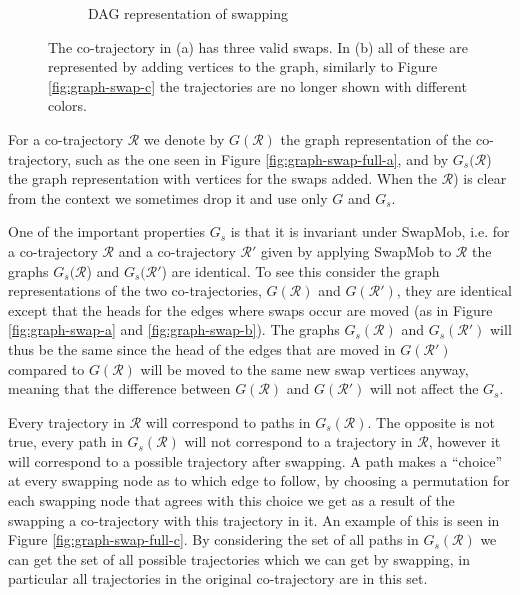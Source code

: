 \documentclass[12pt]{article}
\newcommand{\cotraj}{\mathcal{R}}
\newcommand{\graph}{G}
\newcommand{\swapgraph}{G_s}
\theoremstyle{definition}
\begin{document}
\begin{figure}
\begin{subfigure}[t]{0.45\textwidth}
      \caption{DAG representation of swapping}
      \label{fig:graph-swap-full-b}
    \end{subfigure}
    \caption{The co-trajectory in (a) has three valid swaps. In (b)
      all of these are represented by adding vertices to the graph,
      similarly to Figure \ref{fig:graph-swap-c} the trajectories are
      no longer shown with different colors.}
    \label{fig:graph-swap-full}
\end{figure}

For a co-trajectory \(\cotraj\) we denote by \(\graph(\cotraj)\) the
graph representation of the co-trajectory, such as the one seen in
Figure \ref{fig:graph-swap-full-a}, and by \(\swapgraph(\cotraj\)) the
graph representation with vertices for the swaps added. When the
\(\cotraj\)) is clear from the context we sometimes drop it and use
only \(\graph\) and \(\swapgraph\).

One of the important properties \(\swapgraph\) is that it is invariant
under SwapMob, i.e. for a co-trajectory \(\cotraj\) and a
co-trajectory \(\cotraj'\) given by applying SwapMob to \(\cotraj\)
the graphs \(\swapgraph(\cotraj\)) and \(\swapgraph(\cotraj'\)) are
identical. To see this consider the graph representations of the two
co-trajectories, \(\graph(\cotraj)\) and \(\graph(\cotraj')\), they
are identical except that the heads for the edges where swaps occur
are moved (as in Figure \ref{fig:graph-swap-a} and
\ref{fig:graph-swap-b}). The graphs \(\swapgraph(\cotraj)\) and
\(\swapgraph(\cotraj')\) will thus be the same since the head of the
edges that are moved in \(\graph(\cotraj')\) compared to
\(\graph(\cotraj)\) will be moved to the same new swap vertices
anyway, meaning that the difference between \(\graph(\cotraj)\) and
\(\graph(\cotraj')\) will not affect the \(\swapgraph\).

Every trajectory in \(\cotraj\) will correspond to paths in
\(\swapgraph(\cotraj)\). The opposite is not true, every path in
\(\swapgraph(\cotraj)\) will not correspond to a trajectory in
\(\cotraj\), however it will correspond to a possible trajectory after
swapping. A path makes a ``choice'' at every swapping node as to which
edge to follow, by choosing a permutation for each swapping node that
agrees with this choice we get as a result of the swapping a
co-trajectory with this trajectory in it. An example of this is seen
in Figure \ref{fig:graph-swap-full-c}. By considering the set of all
paths in \(\swapgraph(\cotraj)\) we can get the set of all possible
trajectories which we can get by swapping, in particular all
trajectories in the original co-trajectory are in this set.
\end{document}
